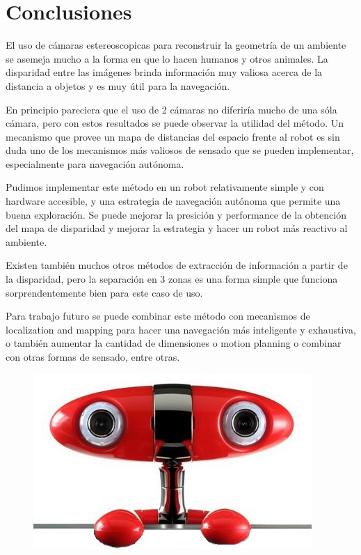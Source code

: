 \documentclass[journal,a4paper]{IEEEtran}
\begin{document}
\section{Conclusiones}

El uso de cámaras estereoscopicas para reconstruir la geometría de un ambiente se asemeja mucho a la forma en que lo hacen humanos y otros animales.
La disparidad entre las imágenes brinda información muy valiosa acerca de la distancia a objetos y es muy útil para la navegación.

En principio pareciera que el uso de 2 cámaras no diferiría mucho de una sóla cámara, pero con estos resultados se puede observar la utilidad del método.
Un mecanismo que provee un mapa de distancias del espacio frente al robot es sin duda uno de los mecanismos más valiosos de sensado que se pueden implementar, especialmente para navegación autónoma.

Pudimos implementar este método en un robot relativamente simple y con hardware accesible, y una estrategia de navegación autónoma que permite una buena exploración.
Se puede mejorar la presición y performance de la obtención del mapa de disparidad y mejorar la estrategia y hacer un robot más reactivo al ambiente.

Existen también muchos otros métodos de extracción de información a partir de la disparidad, pero la separación en 3 zonas es una forma simple que funciona sorprendentemente bien para este caso de uso.

Para trabajo futuro se puede combinar este método con mecanismos de localization and mapping para hacer una navegación más inteligente y exhaustiva, o también aumentar la cantidad de dimensiones o motion planning o combinar con otras formas de sensado, entre otras.

\bigskip

\begin{figure}[h!]
    \centering
    \includegraphics[width=\linewidth]{minoru.jpg}
\end{figure}
\end{document}
